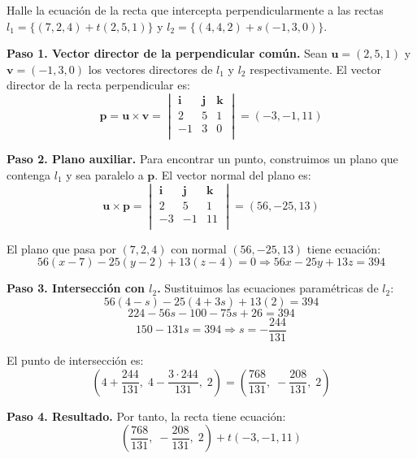 \begin{prob} Halle la ecuación de la recta que intercepta perpendicularmente a las rectas $l_1=\{(7,2,4)+t(2,5,1)\}$ y $l_2=\{(4,4,2)+s(-1,3,0)\}$.

\begin{myproof}	

\textbf{Paso 1. Vector director de la perpendicular común.} Sean $\mathbf{u}=(2,5,1)$ y $\mathbf{v}=(-1,3,0)$ los vectores directores de $l_1$ y $l_2$ respectivamente. El vector director de la recta perpendicular es:
$$\mathbf{p} = \mathbf{u} \times \mathbf{v} =
\begin{vmatrix}
\mathbf{i} & \mathbf{j} & \mathbf{k} \\
2 & 5 & 1 \\
-1 & 3 & 0 \\
\end{vmatrix} =
(-3, -1, 11)$$

\textbf{Paso 2. Plano auxiliar.} Para encontrar un punto, construimos un plano que contenga $l_1$ y sea paralelo a $\mathbf{p}$. El vector normal del plano es:
$$\mathbf{u} \times \mathbf{p} =
\begin{vmatrix}
\mathbf{i} & \mathbf{j} & \mathbf{k} \\
2 & 5 & 1 \\
-3 & -1 & 11 \\
\end{vmatrix} =
(56, -25, 13)$$

El plano que pasa por $(7,2,4)$ con normal $(56,-25,13)$ tiene ecuación:
$$56(x-7)-25(y-2)+13(z-4)=0 \Rightarrow 56x-25y+13z=394$$

\textbf{Paso 3. Intersección con $l_2$.} Sustituimos las ecuaciones paramétricas de $l_2$:
$$56(4-s)-25(4+3s)+13(2)=394$$
$$224-56s-100-75s+26=394$$
$$150 - 131s = 394 \Rightarrow s=-\frac{244}{131}$$

El punto de intersección es:
$$\left(4+\frac{244}{131},\; 4-\frac{3\cdot244}{131},\; 2\right) = \left(\frac{768}{131},\; -\frac{208}{131},\; 2\right)$$

\textbf{Paso 4. Resultado.} Por tanto, la recta tiene ecuación:
$$\boxed{\left(\frac{768}{131},\; -\frac{208}{131},\; 2\right) + t(-3,-1,11)}$$

\end{myproof}
\end{prob}

